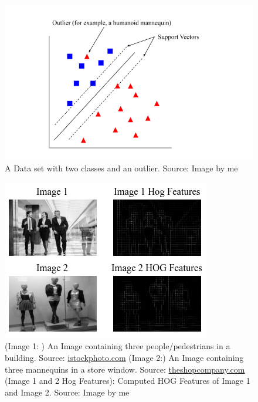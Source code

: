 \begin{figure}
    \centering
    \includegraphics[width=0.75\linewidth]{images/outliers.png}
    \caption{A Data set with two classes and an outlier. Source: Image by me}
    \label{fig:outliers}
\end{figure}

\begin{figure}
    \centering
    \includegraphics[width=0.75\linewidth]{images/features.png}
    \caption{(Image 1: ) An Image containing three people/pedestrians in a building. Source: \href{https://www.istockphoto.com/photo/business-people-taking-a-break-gm639259132-115111535}{istockphoto.com} (Image 2:) An Image containing three mannequins in a store window. Source: \href{https://theshopcompany.com/blog/Mannequins_and_Dressforms_Who_Uses_What}{theshopcompany.com} (Image 1 and 2 Hog Features): Computed HOG Features of Image 1 and Image 2. Source: Image by me}
    \label{fig:manequin_features}
\end{figure}





